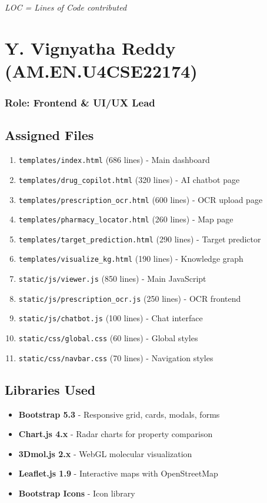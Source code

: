 \documentclass[12pt,a4paper]{report}
\begin{document}
\vspace{0.5cm}
\textit{LOC = Lines of Code contributed}

\newpage

\chapter{Y. Vignyatha Reddy (AM.EN.U4CSE22174)}
\subsection*{Role: Frontend \& UI/UX Lead}

\section{Assigned Files}
\begin{enumerate}
    \item \texttt{templates/index.html} (686 lines) - Main dashboard
    \item \texttt{templates/drug\_copilot.html} (320 lines) - AI chatbot page
    \item \texttt{templates/prescription\_ocr.html} (600 lines) - OCR upload page
    \item \texttt{templates/pharmacy\_locator.html} (260 lines) - Map page
    \item \texttt{templates/target\_prediction.html} (290 lines) - Target predictor
    \item \texttt{templates/visualize\_kg.html} (190 lines) - Knowledge graph
    \item \texttt{static/js/viewer.js} (850 lines) - Main JavaScript
    \item \texttt{static/js/prescription\_ocr.js} (250 lines) - OCR frontend
    \item \texttt{static/js/chatbot.js} (100 lines) - Chat interface
    \item \texttt{static/css/global.css} (60 lines) - Global styles
    \item \texttt{static/css/navbar.css} (70 lines) - Navigation styles
\end{enumerate}

\section{Libraries Used}
\begin{itemize}
    \item \textbf{Bootstrap 5.3} - Responsive grid, cards, modals, forms
    \item \textbf{Chart.js 4.x} - Radar charts for property comparison
    \item \textbf{3Dmol.js 2.x} - WebGL molecular visualization
    \item \textbf{Leaflet.js 1.9} - Interactive maps with OpenStreetMap
    \item \textbf{Bootstrap Icons} - Icon library
\end{itemize}
\end{document}
